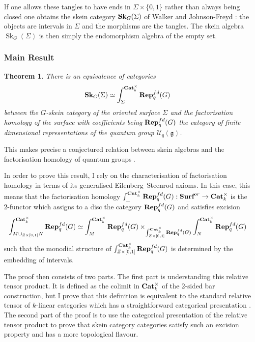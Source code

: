 \documentclass{article}
\newcommand{\catname}[1]{{\normalfont\textbf{#1}}}
\newcommand{\Cat}{\catname{Cat}}
\newcommand{\SK}{\catname{Sk}}
\newcommand{\Rep}{\catname{Rep}}
\newcommand{\Surf}{\catname{Surf}}
\newcommand{\Sk}{\operatorname{Sk}}
\newtheorem{thm}{Theorem}
\begin{document}
If one allows these tangles to have ends in $\Sigma \times \{0,1\}$ rather than always being closed one obtains the skein category $\SK_G(\Sigma)$ of Walker and Johnson-Freyd \cite{JohnsonFreyd19}: the objects are intervals in $\Sigma$ and the morphisms are the tangles. The skein algebra $\Sk_G(\Sigma)$ is then simply the endomorphism algebra of the empty set. 

\subsubsection{Main Result}
\begin{thm}\textup{\cite{C2}}  There is an equivalence of categories 
\[
\SK_G(\Sigma) \simeq \int_{\Sigma}^{\Cat_k^{\times}} \Rep^{fd}_q(G)
\]
between the $G$-skein category of the oriented surface $\Sigma$ and the factorisation homology of the surface with coefficients being $\Rep^{fd}_q(G)$ the category of finite dimensional representations of the quantum group $\mathcal{U}_q(\mathfrak{g})$.
\end{thm}

This makes precise a conjectured relation between skein algebras and the factorisation homology of quantum groups \cite{david1, JohnsonFreyd19}.

In order to prove this result, I rely on the characterisation of factorisation homology in terms of its generalised Eilenberg–Steenrod axioms. In this case, this means that the factorisation homology $\int_{\_}^{\Cat_k^{\times}} \Rep^{fd}_q(G): \Surf^{or} \to \Cat_k^{\times}$ is the $2$-functor which assigns to a disc the category $\Rep^{fd}_q(G)$ and satisfies excision 
$$\int_{M \cup_{Z \times [0,1]} N}^{\Cat_k^{\times}} \Rep^{fd}_q(G) \simeq \int_{M}^{\Cat_k^{\times}} \Rep^{fd}_q(G) \times_{\int_{Z \times [0,1]}^{\Cat_k^{\times}} \Rep^{fd}_q(G) } \int_{N}^{\Cat_k^{\times}} \Rep^{fd}_q(G) $$
 such that the monodial structure of $\int_{Z \times [0,1]}^{\Cat_k^{\times}} \Rep^{fd}_q(G)$ is determined by the embedding of intervals. 

The proof then consists of two parts. The first part is understanding this relative tensor product. It is defined as the colimit in $\Cat_k^{\times}$ of the 2-sided bar construction, but I prove that this definition is equivalent to the standard relative tensor of $k$-linear categories which has a straightforward categorical presentation \cite{Tambara01}. The second part of the proof is to use the categorical presentation of the relative tensor product to prove that skein category categories satisfy such an excision property and has a more topological flavour. 
\end{document}
